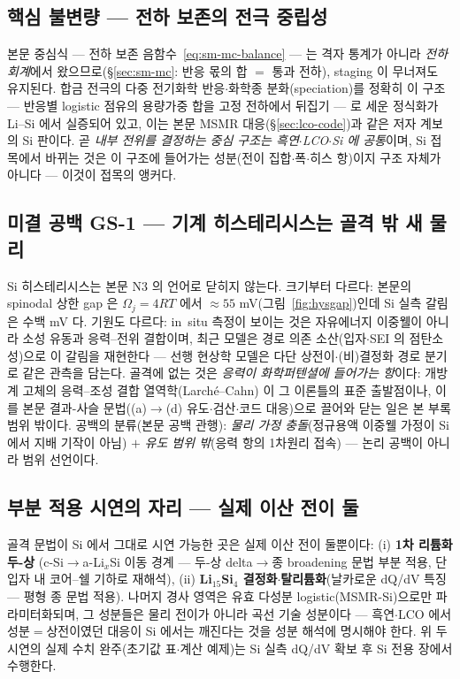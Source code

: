 \subsection{핵심 불변량 --- 전하 보존의 전극 중립성}\label{ssec:si-anchor}
본문 중심식 --- 전하 보존 음함수~\eqref{eq:sm-mc-balance} --- 는 격자 통계가 아니라 \emph{전하
회계}에서 왔으므로(\S\ref{sec:sm-mc}: 반응 몫의 합 $=$ 통과 전하), staging 이 무너져도 유지된다.
합금 전극의 다중 전기화학 반응$\cdot$화학종 분화(speciation)를 정확히 이 구조 --- 반응별 logistic
점유의 용량가중 합을 고정 전하에서 뒤집기 --- 로 세운 정식화가 Li--Si 에서
실증되어 있고\cite{verbrugge_lisi2016}, 이는 본문 MSMR 대응(\S\ref{sec:lco-code})과 같은 저자
계보의 Si 판이다. 곧 \emph{내부 전위를 결정하는 중심 구조는 흑연$\cdot$LCO$\cdot$Si 에 공통}이며,
Si 접목에서 바뀌는 것은 이 구조에 들어가는 성분(전이 집합$\cdot$폭$\cdot$히스 항)이지 구조 자체가
아니다 --- 이것이 접목의 앵커다.

\subsection{미결 공백 GS-1 --- 기계 히스테리시스는 골격 밖 새 물리}\label{ssec:si-gap}
Si 히스테리시스는 본문 N3 의 언어로 닫히지 않는다. 크기부터 다르다: 본문의 spinodal 상한
gap 은 $\Omega_j{=}4RT$ 에서 $\approx55$ mV(그림~\ref{fig:hysgap})인데 Si 실측 갈림은 수백 mV
다\cite{obrovac_chevrier2014}. 기원도 다르다: in~situ 측정이 보이는 것은 자유에너지 이중웰이 아니라
소성 유동과 응력--전위 결합이며\cite{sethuraman_stressevo2010,sethuraman_stresspot2010}, 최근 모델은
경로 의존 소산(입자$\cdot$SEI 의 점탄소성)으로 이 갈림을 재현한다\cite{koebbing2024} ---
선행 현상학 모델은 다단 상전이$\cdot$(비)결정화 경로 분기로 같은 관측을
담는다\cite{jiang_sihys2020}. 골격에 없는 것은 \emph{응력이 화학퍼텐셜에 들어가는 항}이다: 개방계
고체의 응력--조성 결합 열역학(Larché--Cahn)\cite{larchecahn1973} 이 그 이론틀의 표준 출발점이나, 이를
본문 결과-사슬 문법((a)$\to$(d) 유도$\cdot$검산$\cdot$코드 대응)으로 끌어와 닫는 일은 본 부록 범위
밖이다. 공백의 분류(본문 공백 관행): \emph{물리 가정 충돌}(정규용액 이중웰 가정이 Si 에서 지배
기작이 아님) $+$ \emph{유도 범위 밖}(응력 항의 1차원리 접속) --- 논리 공백이 아니라 범위 선언이다.

\subsection{부분 적용 시연의 자리 --- 실제 이산 전이 둘}\label{ssec:si-partial}
골격 문법이 Si 에서 그대로 시연 가능한 곳은 실제 이산 전이 둘뿐이다: (i) \textbf{1차 리튬화 두-상}
(c-Si$\to$a-Li$_x$Si 이동 경계 --- 두-상 delta$\to$종 broadening 문법 부분 적용, 단 입자 내
코어--쉘 기하로 재해석), (ii) \textbf{Li$_{15}$Si$_4$ 결정화$\cdot$탈리튬화}(날카로운 dQ/dV 특징 ---
평형 종 문법 적용). 나머지 경사 영역은 유효 다성분 logistic(MSMR-Si)으로만 파라미터화되며, 그
성분들은 물리 전이가 아니라 곡선 기술 성분이다 --- 흑연$\cdot$LCO 에서 성분$=$상전이였던 대응이 Si
에서는 깨진다는 것을 성분 해석에 명시해야 한다. 위 두 시연의 실제 수치 완주(초기값 표$\cdot$계산
예제)는 Si 실측 dQ/dV 확보 후 Si 전용 장에서 수행한다.

